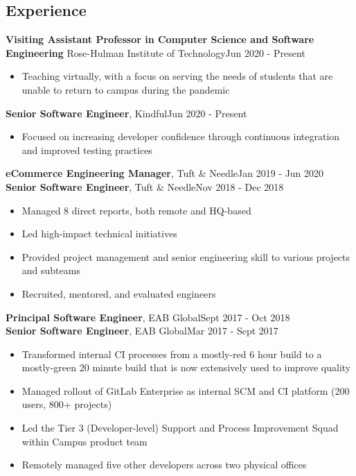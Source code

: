 \documentclass[line, margin, 10pt]{res}
\begin{document}
\renewcommand{\namefont}{ \LARGE \bf }

\address{eliza@elizamarcum.com}
\address{elizamarcum.com}

\begin{resume}
\section{Experience}


{\bf Visiting Assistant Professor in Computer Science and Software Engineering} Rose-Hulman Institute of Technology\hfill Jun 2020 - Present
\begin{itemize} \itemsep -2pt  %
  \item Teaching virtually, with a focus on serving the needs of students that are unable to return to campus during the pandemic
\end{itemize}

{\bf Senior Software Engineer}, Kindful\hfill Jun 2020 - Present
\begin{itemize} \itemsep -2pt  %
  \item Focused on increasing developer confidence through continuous integration and improved testing practices
\end{itemize}

{\bf eCommerce Engineering Manager}, Tuft \& Needle\hfill Jan 2019 - Jun 2020\\
{\bf Senior Software Engineer}, Tuft \& Needle\hfill Nov 2018 - Dec 2018
\begin{itemize} \itemsep -2pt  %
  \item Managed 8 direct reports, both remote and HQ-based
  \item Led high-impact technical initiatives
  \item Provided project management and senior engineering skill to various projects and subteams
  \item Recruited, mentored, and evaluated engineers
\end{itemize}

{\bf Principal Software Engineer}, EAB Global\hfill Sept 2017 - Oct 2018\\
{\bf Senior Software Engineer}, EAB Global\hfill Mar 2017 - Sept 2017
\begin{itemize} \itemsep -2pt  %
  \item Transformed internal CI processes from a mostly-red 6 hour build to a mostly-green 20 minute build that is now extensively used to improve quality
  \item Managed rollout of GitLab Enterprise as internal SCM and CI platform (200 users, 800+ projects)
  \item Led the Tier 3 (Developer-level) Support and Process Improvement Squad within Campus product team
  \item Remotely managed five other developers across two physical offices
\end{itemize}


\end{resume}
\end{document}
